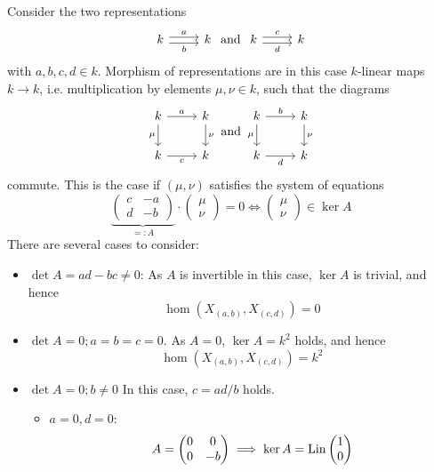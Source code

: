 \begin{sol}
  Consider the two representations
  \[
  \begin{tikzcd}
    k\ar[shift left]{r}{a}\ar[shift right,swap]{r}{b}&k
  \end{tikzcd}
  ~\text{and}~
  \begin{tikzcd}
    k\ar[shift left]{r}{c}\ar[shift right,swap]{r}{d}&k
  \end{tikzcd}
  \]
  with $a,b,c,d\in k$.
Morphism of representations are in this case $k$-linear maps $k\to k$, i.e. multiplication by elements $\mu,\nu\in k$, such that the diagrams
\[
\begin{tikzcd}
  k\ar{r}{a}\ar[swap]{d}{\mu}&k\ar{d}{\nu}\\
  k\ar[swap]{r}{c}&k
\end{tikzcd}~\text{and}~
\begin{tikzcd}
  k\ar{r}{b}\ar[swap]{d}{\mu}&k\ar{d}{\nu}\\
  k\ar[swap]{r}{d}&k
\end{tikzcd}
\]
commute. This is the case if $(\mu,\nu)$ satisfies the system of equations
\[
\underbrace{\begin{pmatrix}
  c&-a\\
  d&-b
\end{pmatrix}}_{=:A}\cdot \begin{pmatrix}\mu\\\nu\end{pmatrix}=0 \Longleftrightarrow \begin{pmatrix}\mu\\\nu\end{pmatrix} \in \ker A
\]
There are several cases to consider:
\begin{itemize}
  \item $\det A=ad-bc\neq 0$: As $A$ is invertible in this case, $\ker A$ is trivial, and hence
  \[
  \hom(X_{(a,b)},X_{(c,d)})=0
  \]
  \item $\det A = 0; a=b=c=0$. As $A=0$, $\ker A = k^2$ holds, and hence
  \[
  \hom(X_{(a,b)},X_{(c,d)})=k^2\]
  \item $\det A =0;b\neq 0$ In this case, $c=ad/b$ holds.
  \begin{itemize}
    \item $a = 0,d=0 $:
    \[
    A = \begin{pmatrix}0&0\\0&-b\end{pmatrix}\implies \ker A = \operatorname{Lin} \begin{pmatrix}1\\0\end{pmatrix}\]

\end{itemize}
\end{itemize}
\end{sol}
